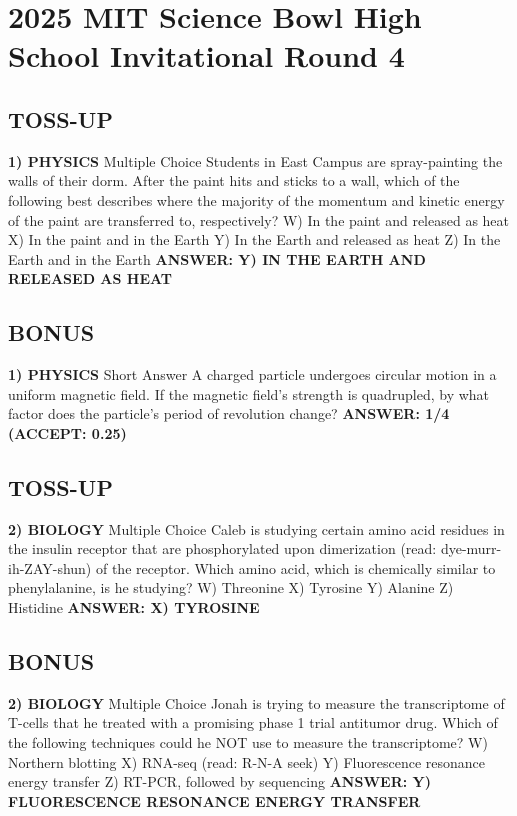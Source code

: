 \documentclass{article}
\begin{document}
\section*{2025 MIT Science Bowl High School Invitational Round 4}

\subsection*{TOSS-UP}
\textbf{1) PHYSICS} 
Multiple Choice Students in East Campus are spray-painting the walls of their dorm.
After the paint hits and sticks to a wall, which of the following best describes where the majority of the momentum and kinetic energy of the paint are transferred to, respectively?
W) In the paint and released as heat
X) In the paint and in the Earth
Y) In the Earth and released as heat
Z) In the Earth and in the Earth
\textbf{ANSWER: Y) IN THE EARTH AND RELEASED AS HEAT}

\subsection*{BONUS}
\textbf{1) PHYSICS}
Short Answer A charged particle undergoes circular motion in a uniform magnetic field.
If the magnetic field's strength is quadrupled, by what factor does the particle's period of revolution change?
\textbf{ANSWER: 1/4 (ACCEPT: 0.25)}

\newpage

\subsection*{TOSS-UP}
\textbf{2) BIOLOGY} 
Multiple Choice Caleb is studying certain amino acid residues in the insulin receptor that are phosphorylated upon dimerization (read: dye-murr-ih-ZAY-shun) of the receptor.
Which amino acid, which is chemically similar to phenylalanine, is he studying?
W) Threonine
X) Tyrosine
Y) Alanine
Z) Histidine
\textbf{ANSWER: X) TYROSINE}

\subsection*{BONUS}
\textbf{2) BIOLOGY}
Multiple Choice Jonah is trying to measure the transcriptome of T-cells that he treated with a promising phase 1 trial antitumor drug.
Which of the following techniques could he NOT use to measure the transcriptome?
W) Northern blotting
X) RNA-seq (read: R-N-A seek)
Y) Fluorescence resonance energy transfer
Z) RT-PCR, followed by sequencing
\textbf{ANSWER: Y) FLUORESCENCE RESONANCE ENERGY TRANSFER}
\end{document}
